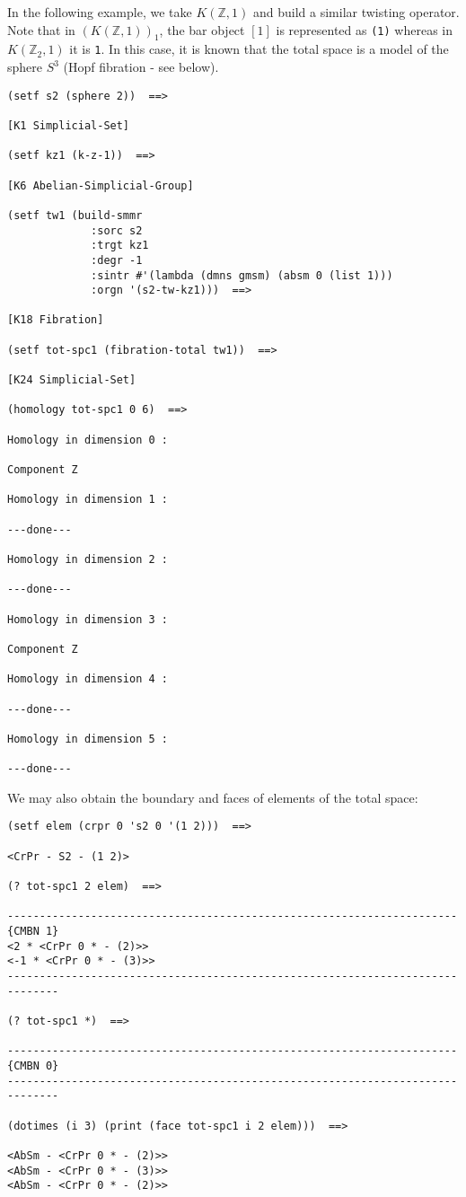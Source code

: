 In the following example, we take $K(\mathbb{Z},1)$ and build a similar twisting o\-pe\-ra\-tor. Note
that in $(K(\mathbb{Z},1))_1$, the bar object $[1]$ is represented as {\tt (1)} whereas in $K(\mathbb{Z}_2,1)$ it
is {\tt 1}. In this case, it is known that the total space is a model of the sphere $S^3$
(Hopf fibration - see below).
{\footnotesize\begin{verbatim}
(setf s2 (sphere 2))  ==>

[K1 Simplicial-Set]

(setf kz1 (k-z-1))  ==>

[K6 Abelian-Simplicial-Group]

(setf tw1 (build-smmr
             :sorc s2
             :trgt kz1
             :degr -1
             :sintr #'(lambda (dmns gmsm) (absm 0 (list 1)))
             :orgn '(s2-tw-kz1)))  ==>

[K18 Fibration]

(setf tot-spc1 (fibration-total tw1))  ==>

[K24 Simplicial-Set]

(homology tot-spc1 0 6)  ==>

Homology in dimension 0 :

Component Z

Homology in dimension 1 :

---done---

Homology in dimension 2 :

---done---

Homology in dimension 3 :

Component Z

Homology in dimension 4 :

---done---

Homology in dimension 5 :

---done---
\end{verbatim}}
We may also obtain the boundary and faces of elements of the total space:
{\footnotesize\begin{verbatim}
(setf elem (crpr 0 's2 0 '(1 2)))  ==>

<CrPr - S2 - (1 2)>

(? tot-spc1 2 elem)  ==>

----------------------------------------------------------------------{CMBN 1}
<2 * <CrPr 0 * - (2)>>
<-1 * <CrPr 0 * - (3)>>
------------------------------------------------------------------------------

(? tot-spc1 *)  ==>

----------------------------------------------------------------------{CMBN 0}
------------------------------------------------------------------------------

(dotimes (i 3) (print (face tot-spc1 i 2 elem)))  ==>

<AbSm - <CrPr 0 * - (2)>>
<AbSm - <CrPr 0 * - (3)>>
<AbSm - <CrPr 0 * - (2)>>
\end{verbatim}}
